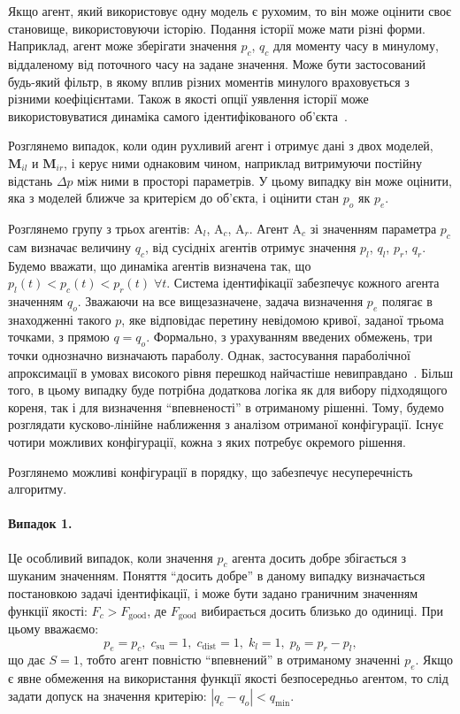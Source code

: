 Якщо агент, який використовує одну модель є рухомим, то він може
оцінити своє становище, використовуючи історію. Подання історії
може мати різні форми. Наприклад, агент може зберігати значення
$ p_c $,
$ q_c $ для моменту часу в минулому, віддаленому від поточного часу
на задане значення. Може бути застосований будь-який
фільтр, в якому вплив різних моментів минулого враховується з
різними коефіцієнтами. Також в якості опції уявлення історії
може використовуватися динаміка самого ідентифікованого
об'єкта~\cite{mich_92}.

Розглянемо випадок, коли один рухливий агент і отримує дані з
двох моделей,
$ \mathbf{M}_{il}$ и
$ \mathbf{M}_{ir}$,
і керує ними однаковим чином, наприклад витримуючи постійну
відстань
$ \Delta p $ між ними в просторі параметрів. У цьому випадку він може
оцінити, яка з моделей ближче за критерієм до об'єкта, і оцінити стан
$ p_o $ як $ p_e $.

Розглянемо групу з трьох агентів:
$\mathrm{A}_l$,
$\mathrm{A}_c$,
$\mathrm{A}_r$.
Агент $\mathrm {A} _c$ зі значенням параметра $p_c$ сам визначає величину
$q_c$, від сусідніх агентів отримує значення $p_l$, $q_l$, $p_r$, $q_r$.
Будемо вважати, що динаміка агентів визначена так, що
$p_l(t) < p_c (t) < p_r(t) \; \forall t$.
Система ідентифікації забезпечує кожного агента
значенням $q_o$.
Зважаючи на все вищезазначене,
задача
визначення $p_e$ полягає в знаходженні такого $p$, яке відповідає перетину
невідомою кривої, заданої трьома точками, з прямою $q = q_o$.
Формально, з урахуванням введених обмежень, три точки однозначно визначають параболу. Однак,
застосування параболічної апроксимації в умовах високого рівня перешкод
найчастіше невиправдано~\cite{atu_asau27}.
Більш того, в цьому випадку буде потрібна додаткова
логіка як для вибору підходящого кореня, так і для визначення ``впевненості''
в отриманому рішенні.
Тому, будемо розглядати кусково-лінійне наближення з
аналізом отриманої конфігурації. Існує чотири можливих конфігурації,
кожна з яких потребує окремого рішення.

Розглянемо можливі конфігурації в порядку, що забезпечує
несуперечність алгоритму.

\paragraph{Випадок 1.}
Це особливий випадок, коли значення
$ p_c $ агента досить добре збігається з шуканим значенням. Поняття
``досить добре'' в даному випадку визначається постановкою
задачі ідентифікації, і може бути задано граничним значенням функції якості:
$ F_c> F_{\mathrm{good}} $, де
$ F_{\mathrm{good}} $ вибирається досить близько до одиниці. При цьому
вважаємо:
%
\[
p_e = p_c, \; c_\mathrm{su} = 1, \;  c_\mathrm{dist} = 1, \;  k_l = 1, \;  p_b = p_r - p_l,
\]
%
що дає
$ S = 1 $, тобто агент повністю ``впевнений'' в отриманому значенні
$ p_e $. Якщо є явне обмеження на використання функції якості
безпосередньо агентом, то слід задати допуск на значення
критерію:
$ |q_c-q_o| < q_{\min}$.

